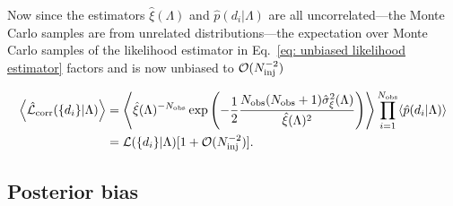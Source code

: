 Now since the estimators $\hat{\xi}(\Lambda)$ and $\hat{p}(d_i|\Lambda)$ are all uncorrelated---the Monte Carlo samples are from unrelated distributions---the expectation over Monte Carlo samples of the likelihood estimator in Eq.~\ref{eq: unbiased likelihood estimator} factors and is now unbiased to $\mathcal{O}(N_{\rm inj}^{-2})$

\begin{equation}\begin{split}
    \left\langle \hat{\mathcal{L}}_{\rm corr}(\{d_i\} | \Lambda) \right\rangle &= \left\langle \hat{\xi}(\Lambda)^{-N_{\rm obs}}\exp\left(-\frac{1}{2}\frac{N_{\rm obs}(N_{\rm obs}+1)\hat{\sigma}_\xi^2(\Lambda)}{\hat{\xi}(\Lambda)^2}\right) \right\rangle\prod_{i=1}^{N_{\rm obs}}\langle \hat{p}(d_i|\Lambda)\rangle \\ &= \mathcal{L}(\{d_i\}|\Lambda)[1 + \mathcal{O}(N_{\rm inj}^{-2})].
\end{split}\end{equation}

\subsection{Posterior bias}

